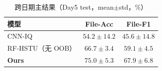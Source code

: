 \begin{table}[htbp]
  \centering
  \caption{跨日期主结果（Day5 test，mean$\pm$std，\%）}
  \label{tab:ch3_main}
  \begin{tabular}{lcc}
    \toprule
    模型 & File-Acc & File-F1 \\
    \midrule
    CNN-IQ & $54.2\pm14.2$ & $45.6\pm14.8$ \\
    RF-HSTU（无 OOB） & $66.7\pm3.4$ & $59.1\pm4.5$ \\
    \textbf{Ours} & $\mathbf{75.0\pm5.3}$ & $\mathbf{67.9\pm6.8}$ \\
    \bottomrule
  \end{tabular}
\end{table}
